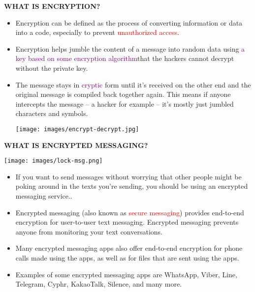 \documentclass{beamer}
\begin{document}
\begin{frame}
\begin{tcolorbox}
\begin{center}
\textsc{\textbf{\textcolor{byzantium}{WHAT IS ENCRYPTION?}}}
\end{center}
\end{tcolorbox}
\begin{flushleft}
\begin{itemize}
\item Encryption can be defined as the process of converting information or data into a code, especially to prevent \textcolor{red} {unauthorized access}.
\item Encryption helps jumble the content of a message into random data using \textcolor{purple} {a key based on some encryption algorithm}that the hackers cannot decrypt without the private key.
\item The message stays in \textcolor{purple} {cryptic} form until it’s received on the other end and the original message is compiled back together again. This means if anyone intercepts the message -- a hacker for example -- it’s mostly just jumbled characters and symbols.
\begin{center}
\texttt{[image: images/encrypt-decrypt.jpg]}
\end{center}
\end{itemize}
\end{flushleft}
\end{frame}


\begin{frame}
\begin{tcolorbox}
\begin{center}
\textsc{\textbf{\textcolor{byzantium}{WHAT IS ENCRYPTED MESSAGING?}}}
\end{center}
\begin{center}
\texttt{[image: images/lock-msg.png]}
\end{center}
\end{tcolorbox}
\begin{flushleft}
\begin{itemize}
\item If you want to send messages without worrying that other people might be poking around in the texts you’re sending, you should be using an encrypted messaging service..
\item Encrypted messaging (also known as \textcolor{red}{secure messaging}) provides end-to-end encryption for user-to-user text messaging. Encrypted messaging prevents anyone from monitoring your text conversations. 
\item Many encrypted messaging apps also offer end-to-end encryption for phone calls made using the apps, as well as for files that are sent using the apps.
\item Examples of some encrypted messaging apps are WhatsApp, Viber, Line, Telegram, Cyphr, KakaoTalk, Silence, and many more.
\end{itemize}
\end{flushleft}
\end{frame}
\end{document}
